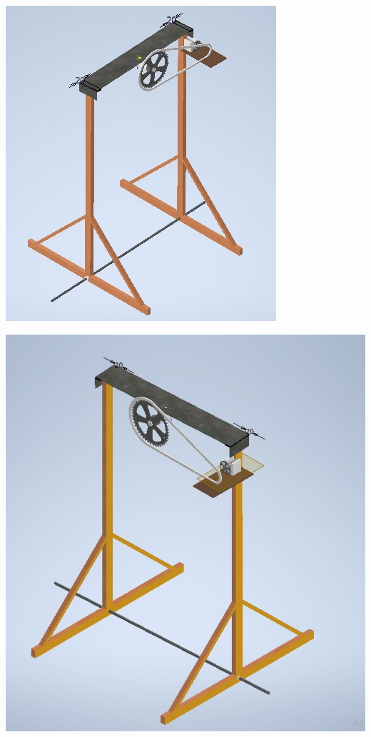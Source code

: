 \begin{center}
\includegraphics[width=.6\linewidth]{A/figs/elements/A_8.jpeg}  
\end{center}

\begin{center}
\quad\includegraphics[width=1\linewidth]{A/figs/elements/A_9.jpeg}  


\end{center}
